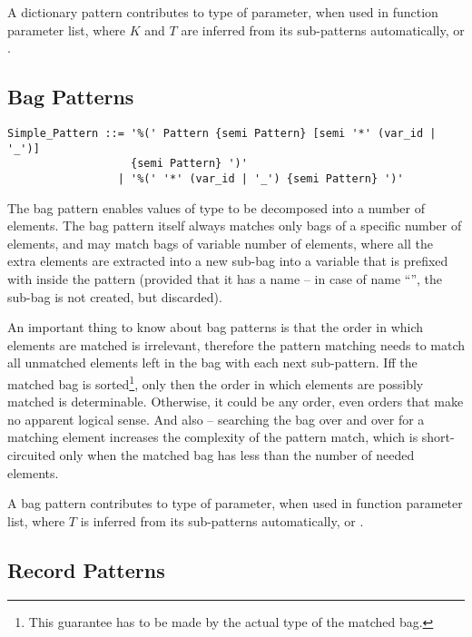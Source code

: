 A dictionary pattern contributes  to type of parameter, when used in function parameter list, where $K$ and $T$ are inferred from its sub-patterns automatically, or . 





\subsection{Bag Patterns}
\label{sec:bag-patterns}

\syntax\begin{lstlisting}
Simple_Pattern ::= '%(' Pattern {semi Pattern} [semi '*' (var_id | '_')] 
                   {semi Pattern} ')'
                 | '%(' '*' (var_id | '_') {semi Pattern} ')'
\end{lstlisting}

The bag pattern enables values of  type to be decomposed into a number of elements. The bag pattern itself always matches only bags of a specific number of elements, and may match bags of variable number of elements, where all the extra elements are extracted into a new sub-bag into a variable that is prefixed with \code{*} inside the pattern (provided that it has a name -- in case of name ``\code{_}'', the sub-bag is not created, but discarded). 

An important thing to know about bag patterns is that the order in which elements are matched is irrelevant, therefore the pattern matching needs to match all unmatched elements left in the bag with each next sub-pattern. Iff the matched bag is sorted\footnote{This guarantee has to be made by the actual type of the matched bag.}, only then the order in which elements are possibly matched is determinable. Otherwise, it could be any order, even orders that make no apparent logical sense. And also -- searching the bag over and over for a matching element increases the complexity of the pattern match, which is short-circuited only when the matched bag has less than the number of needed elements. 

A bag pattern contributes  to type of parameter, when used in function parameter list, where $T$ is inferred from its sub-patterns automatically, or . 





\subsection{Record Patterns}
\label{sec:record-patterns}

